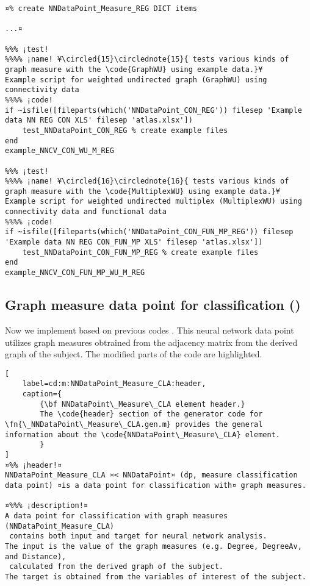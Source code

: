 \documentclass{tufte-handout}
\begin{document}
\begin{lstlisting}
¤% create NNDataPoint_Measure_REG DICT items

...¤

%%% ¡test!
%%%% ¡name! ¥\circled{15}\circlednote{15}{ tests various kinds of graph measure with the \code{GraphWU} using example data.}¥
Example script for weighted undirected graph (GraphWU) using connectivity data
%%%% ¡code!
if ~isfile([fileparts(which('NNDataPoint_CON_REG')) filesep 'Example data NN REG CON XLS' filesep 'atlas.xlsx'])
    test_NNDataPoint_CON_REG % create example files
end
example_NNCV_CON_WU_M_REG

%%% ¡test!
%%%% ¡name! ¥\circled{16}\circlednote{16}{ tests various kinds of graph measure with the \code{MultiplexWU} using example data.}¥
Example script for weighted undirected multiplex (MultiplexWU) using connectivity data and functional data
%%%% ¡code!
if ~isfile([fileparts(which('NNDataPoint_CON_FUN_MP_REG')) filesep 'Example data NN REG CON_FUN_MP XLS' filesep 'atlas.xlsx'])
    test_NNDataPoint_CON_FUN_MP_REG % create example files
end
example_NNCV_CON_FUN_MP_WU_M_REG

\end{lstlisting}

\clearpage

\subsection{Graph measure data point for classification ()}

Now we implement  based on previous codes .
This neural network data point utilizes graph measures obtrained from the adjacency matrix from the derived graph of the subject. 
The modified parts of the code are highlighted.

\begin{lstlisting}[
	label=cd:m:NNDataPoint_Measure_CLA:header,
	caption={
		{\bf NNDataPoint\_Measure\_CLA element header.}
		The \code{header} section of the generator code for \fn{\_NNDataPoint\_Measure\_CLA.gen.m} provides the general information about the \code{NNDataPoint\_Measure\_CLA} element.
		}
]
¤%% ¡header!¤
NNDataPoint_Measure_CLA ¤< NNDataPoint¤ (dp, measure classification data point) ¤is a data point for classification with¤ graph measures.

¤%%% ¡description!¤
A data point for classification with graph measures (NNDataPoint_Measure_CLA) 
 contains both input and target for neural network analysis.
The input is the value of the graph measures (e.g. Degree, DegreeAv, and Distance), 
 calculated from the derived graph of the subject.
The target is obtained from the variables of interest of the subject.
\end{lstlisting}
\end{document}
